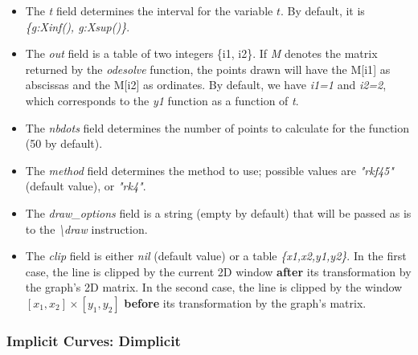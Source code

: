 \begin{itemize}
\begin{itemize}
\begin{itemize}
    \item The \emph{t} field determines the interval for the variable \(t\). By default, it is \emph{\{g:Xinf(), g:Xsup()\}}.
    \item The \emph{out} field is a table of two integers \{i1, i2\}. If \emph{M} denotes the matrix returned by the \emph{odesolve} function, the points drawn will have the M{[}i1{]} as abscissas and the M{[}i2{]} as ordinates. By default, we have \emph{i1=1} and \emph{i2=2}, which corresponds to the \emph{y1} function as a function of \emph{t}.
    \item The \emph{nbdots} field determines the number of points to calculate for the function (50 by default).
    \item The \emph{method} field determines the method to use; possible values ​​are \emph{"rkf45"} (default value), or \emph{"rk4"}.     \item The \emph{draw\_options} field is a string (empty by default) that will be passed as is to the \emph{\textbackslash draw} instruction.
    \item The \emph{clip} field is either \emph{nil} (default value) or a table \emph{\{x1,x2,y1,y2\}}. In the first case, the line is clipped by the current 2D window \textbf{after} its transformation by the graph's 2D matrix. In the second case, the line is clipped by the window $[x_1,x_2]\times[y_1,y_2]$ \textbf{before} its transformation by the graph's matrix.

\end{itemize}
\end{itemize}
\end{itemize}

\subsubsection{Implicit Curves: Dimplicit}

